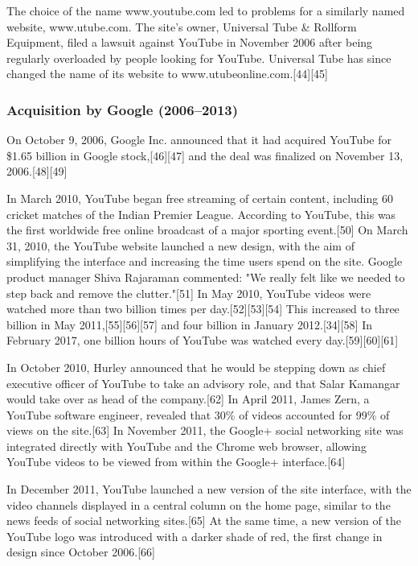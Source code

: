 \documentclass[12pt]{article}
\begin{document}
The choice of the name www.youtube.com led to problems for a similarly named website, www.utube.com. The site's owner, Universal Tube \& Rollform Equipment, filed a lawsuit against YouTube in November 2006 after being regularly overloaded by people looking for YouTube. Universal Tube has since changed the name of its website to www.utubeonline.com.[44][45] 



\subsubsection{Acquisition by Google (2006–2013)}



On October 9, 2006, Google Inc. announced that it had acquired YouTube for \$1.65 billion in Google stock,[46][47] and the deal was finalized on November 13, 2006.[48][49]


In March 2010, YouTube began free streaming of certain content, including 60 cricket matches of the Indian Premier League. According to YouTube, this was the first worldwide free online broadcast of a major sporting event.[50] On March 31, 2010, the YouTube website launched a new design, with the aim of simplifying the interface and increasing the time users spend on the site. Google product manager Shiva Rajaraman commented: "We really felt like we needed to step back and remove the clutter."[51] In May 2010, YouTube videos were watched more than two billion times per day.[52][53][54] This increased to three billion in May 2011,[55][56][57] and four billion in January 2012.[34][58] In February 2017, one billion hours of YouTube was watched every day.[59][60][61]

In October 2010, Hurley announced that he would be stepping down as chief executive officer of YouTube to take an advisory role, and that Salar Kamangar would take over as head of the company.[62] In April 2011, James Zern, a YouTube software engineer, revealed that 30\% of videos accounted for 99\% of views on the site.[63] In November 2011, the Google+ social networking site was integrated directly with YouTube and the Chrome web browser, allowing YouTube videos to be viewed from within the Google+ interface.[64] 


In December 2011, YouTube launched a new version of the site interface, with the video channels displayed in a central column on the home page, similar to the news feeds of social networking sites.[65] At the same time, a new version of the YouTube logo was introduced with a darker shade of red, the first change in design since October 2006.[66]
\end{document}
